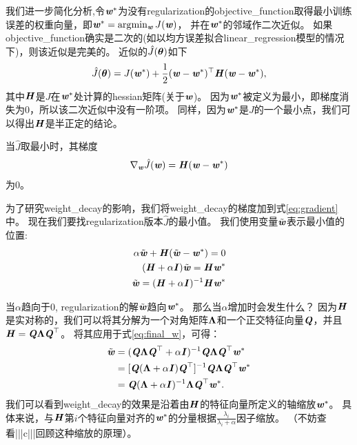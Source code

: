 我们进一步简化分析,令$\Vw^*$为没有\gls{regularization}的\gls{objective_function}取得最小训练误差的权重向量，即$\Vw^* = \argmin_{\Vw} J(\Vw)$， 并在$\Vw^*$的邻域作二次近似。
如果\gls{objective_function}确实是二次的(如以均方误差拟合\gls{linear_regression}模型的情况下)，则该近似是完美的。
近似的$\hat J(\Vtheta)$如下
\begin{align}
 \hat J(\Vtheta) = J(\Vw^*) + \frac{1}{2}(\Vw - \Vw^*)^\top \MH (\Vw - \Vw^*),
\end{align}
其中$\MH$是$J$在$\Vw^*$处计算的\gls{hessian}矩阵(关于$\Vw$)。
因为$\Vw^*$被定义为最小，即梯度消失为0，所以该二次近似中没有一阶项。
同样，因为$\Vw^*$是$J$的一个最小点，我们可以得出$\MH$是半正定的结论。

当$\hat J$取最小时，其梯度
\begin{align}
\label{eq:gradient}
  \nabla_{\Vw} \hat{J}(\Vw) = \MH (\Vw - \Vw^*)
\end{align}
为0。

为了研究\gls{weight_decay}的影响，我们将\gls{weight_decay}的梯度加到式\ref{eq:gradient}中。 
现在我们要找\gls{regularization}版本$\hat J$的最小值。
我们使用变量$\tilde{\Vw}$表示最小值的位置:
\begin{align}
 \alpha \tilde{\Vw} + \MH (\tilde{\Vw} - \Vw^*) = 0 \\
 (\MH + \alpha \MI) \tilde{\Vw} = \MH \Vw^* \\
 \tilde{\Vw} = (\MH + \alpha \MI)^{-1} \MH \Vw^* \label{eq:final_w}
 \end{align}

当$\alpha$趋向于0, \gls{regularization}的解$\tilde{\Vw}$趋向$\Vw^*$。 
那么当$\alpha$增加时会发生什么？
因为$\MH$是实对称的，我们可以将其分解为一个对角矩阵$\VLambda$和一个正交特征向量$\MQ$，并且$\MH = \MQ \VLambda \MQ^\top$。
将其应用于式\ref{eq:final_w}，可得：
\begin{align}
 \tilde \Vw &= ( \MQ \VLambda \MQ^\top + \alpha \MI)^{-1} \MQ \VLambda \MQ^\top \Vw^* \\
                 &=  [ \MQ( \VLambda+ \alpha \MI)  \MQ^\top ]^{-1} \MQ \VLambda \MQ^\top \Vw^* \\
                 &= \MQ( \VLambda+ \alpha \MI)^{-1} \VLambda \MQ^\top \Vw^*. \label{eq:713L2}
\end{align}
我们可以看到\gls{weight_decay}的效果是沿着由$\MH$的特征向量所定义的轴缩放$\Vw^*$。
具体来说，与$\MH$第$i$个特征向量对齐的$\Vw^*$的分量根据$\frac{\lambda_i}{\lambda_i + \alpha}$因子缩放。
（不妨查看|||c|||回顾这种缩放的原理）。

